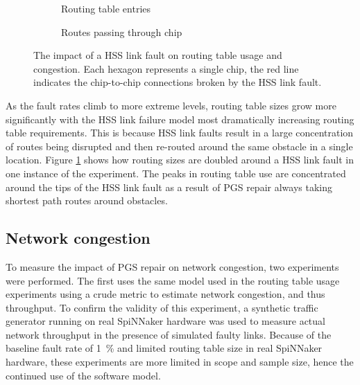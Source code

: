 			\begin{figure}
				\center
				\begin{subfigure}{0.48\linewidth}
					\center
					
					\caption{Routing table entries}
					\label{fig:hss-link-routing-table-usage}
				\end{subfigure}
				\begin{subfigure}{0.48\linewidth}
					\center
					
					\caption{Routes passing through chip}
					\label{fig:hss-link-resource-usage}
				\end{subfigure}
				
				\caption{The impact of a HSS link fault on routing table usage and
				congestion. Each hexagon represents a single chip, the red line
				indicates the chip-to-chip connections broken by the HSS link fault.}
				\label{fig:hss-link-usage}
			\end{figure}
			
			As the fault rates climb to more extreme levels, routing table sizes grow
			more significantly with the HSS link failure model most dramatically
			increasing routing table requirements.  This is because HSS link faults
			result in a large concentration of routes being disrupted and then
			re-routed around the same obstacle in a single location. Figure
			\ref{fig:hss-link-routing-table-usage} shows how routing sizes are
			doubled around a HSS link fault in one instance of the experiment. The
			peaks in routing table use are concentrated around the tips of the HSS
			link fault as a result of PGS repair always taking shortest path routes
			around obstacles.
		
		\subsection{Network congestion}
			
			To measure the impact of PGS repair on network congestion, two
			experiments were performed. The first uses the same model used in the
			routing table usage experiments using a crude metric to estimate network
			congestion, and thus throughput. To confirm the validity of this
			experiment, a synthetic traffic generator running on real SpiNNaker
			hardware was used to measure actual network throughput in the presence of
			simulated faulty links. Because of the baseline fault rate of
			\SI{1}{\percent} and limited routing table size in real SpiNNaker
			hardware, these experiments are more limited in scope and sample size,
			hence the continued use of the software model.
			
